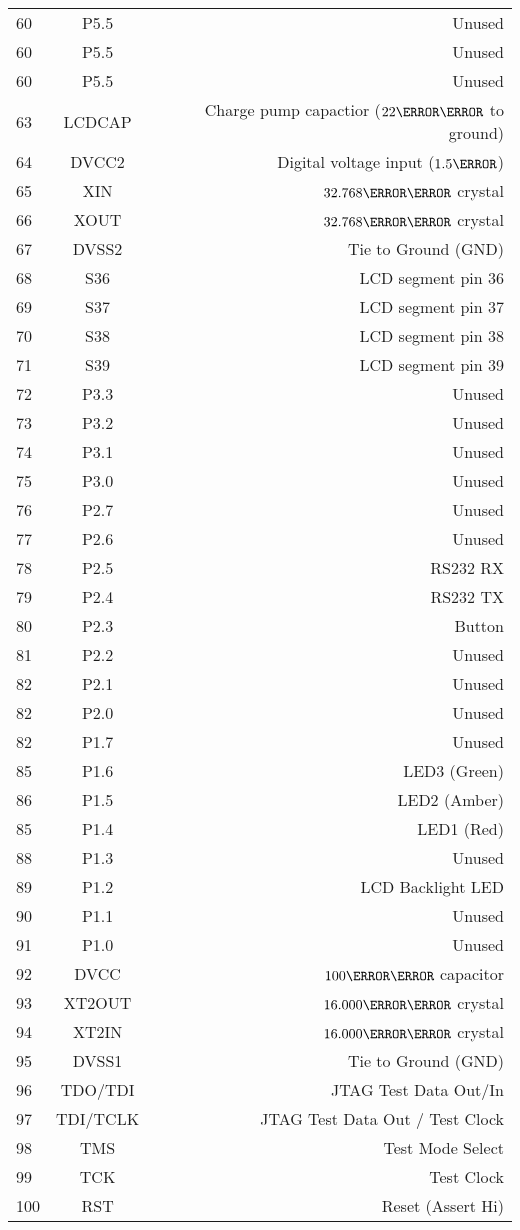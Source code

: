 {\begin{longtable}[c]{|l|c|r|}
  60 & P5.5 & Unused \\
  60 & P5.5 & Unused \\
  60 & P5.5 & Unused \\
  63 & LCDCAP & Charge pump capactior ($22\micro\farad$ to ground) \\
  64 & DVCC2 & Digital voltage input ($1.5\volt$) \\
  65 & XIN & $32.768\kilo\hertz$ crystal \\
  66 & XOUT & $32.768\kilo\hertz$ crystal \\
  67 & DVSS2 & Tie to Ground (GND) \\
  68 & S36 & LCD segment pin 36 \\
  69 & S37 & LCD segment pin 37 \\
  70 & S38 & LCD segment pin 38 \\
  71 & S39 & LCD segment pin 39 \\
  72 & P3.3 & Unused \\
  73 & P3.2 & Unused \\
  74 & P3.1 & Unused \\
  75 & P3.0 & Unused \\
  76 & P2.7 & Unused \\
  77 & P2.6 & Unused \\
  78 & P2.5 & RS232 RX \\
  79 & P2.4 & RS232 TX \\
  80 & P2.3 & Button \\
  81 & P2.2 & Unused \\
  82 & P2.1 & Unused \\
  82 & P2.0 & Unused \\
  82 & P1.7 & Unused \\
  85 & P1.6 & LED3 (Green)\\
  86 & P1.5 & LED2 (Amber)\\
  85 & P1.4 & LED1 (Red) \\
  88 & P1.3 & Unused \\
  89 & P1.2 & LCD Backlight LED \\
  90 & P1.1 & Unused \\
  91 & P1.0 & Unused \\
  92 & DVCC & $100\nano\farad$ capacitor \\
  93 & XT2OUT & $16.000\mega\hertz$ crystal \\
  94 & XT2IN & $16.000\mega\hertz$ crystal \\
  95 & DVSS1 & Tie to Ground (GND) \\
  96 & TDO/TDI & JTAG Test Data Out/In \\
  97 & TDI/TCLK & JTAG Test Data Out / Test Clock \\
  98 & TMS & Test Mode Select \\
  99 & TCK & Test Clock \\
  100 & RST & Reset (Assert Hi) \\ \hline
\end{longtable}
}

